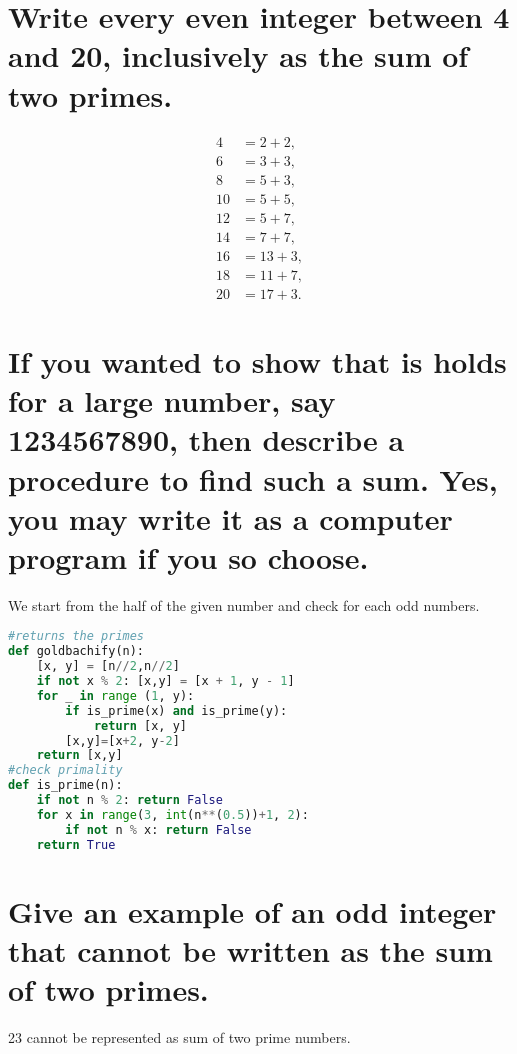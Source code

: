 
\begin{parts}
    
\part{
    Write every even integer
    between 4 and 20, inclusively
    as the sum of two primes.
}
\begin{solution}
    \begin{align}
        4&=2+2,\\
        6&=3+3,\\
        8&=5+3,\\
        10&=5+5,\\
        12&=5+7,\\
        14&=7+7,\\
        16&=13+3,\\
        18&=11+7,\\
        20&=17+3.
    \end{align}
\end{solution}

\part{
    If you wanted to show that is
    holds for a large number, say
    1234567890, then describe
    a procedure to find such a sum.
    Yes, you may write it as a
    computer program if
    you so choose.
}
\begin{solution}
    We start from the half of the given
    number
    and check for each odd numbers.
    \begin{lstlisting}[language = Python]
#returns the primes
def goldbachify(n):
    [x, y] = [n//2,n//2]
    if not x % 2: [x,y] = [x + 1, y - 1]
    for _ in range (1, y):
        if is_prime(x) and is_prime(y):
            return [x, y]
        [x,y]=[x+2, y-2]
    return [x,y]
#check primality
def is_prime(n):
    if not n % 2: return False
    for x in range(3, int(n**(0.5))+1, 2):
        if not n % x: return False
    return True
    \end{lstlisting}
\end{solution}

\part{
    Give an example of an odd
    integer that cannot be written
    as the sum of two primes.
}
\begin{solution}
    23 cannot be represented as sum of
    two prime numbers.
\end{solution}


\end{parts}
